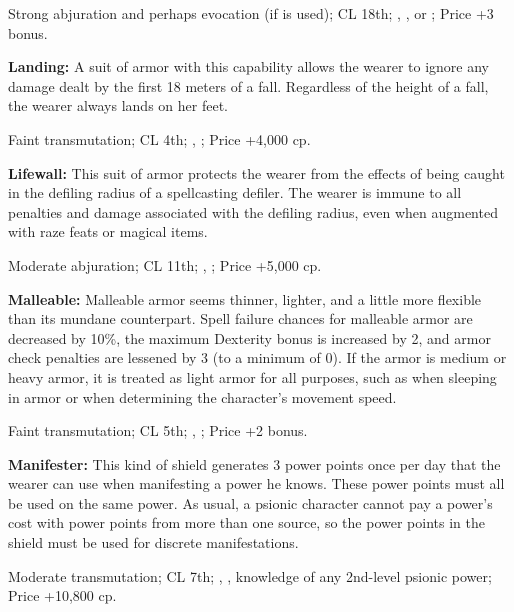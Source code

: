 Strong abjuration and perhaps evocation (if  is used); CL 18th; , ,  or ; Price +3 bonus.

\textbf{Landing:} A suit of armor with this capability allows the wearer to ignore any damage dealt by the first 18 meters of a fall. Regardless of the height of a fall, the wearer always lands on her feet.

Faint transmutation; CL 4th; , ; Price +4,000 cp.

\textbf{Lifewall:} This suit of armor protects the wearer from the effects of being caught in the defiling radius of a spellcasting defiler. The wearer is immune to all penalties and damage associated with the defiling radius, even when augmented with raze feats or magical items.

Moderate abjuration; CL 11th; , ; Price +5,000 cp.



\textbf{Malleable:} Malleable armor seems thinner, lighter, and a little more flexible than its mundane counterpart. Spell failure chances for malleable armor are decreased by 10\%, the maximum Dexterity bonus is increased by 2, and armor check penalties are lessened by 3 (to a minimum of 0). If the armor is medium or heavy armor, it is treated as light armor for all purposes, such as when sleeping in armor or when determining the character's movement speed.

Faint transmutation; CL 5th; , ; Price +2 bonus.

\textbf{Manifester:} This kind of shield generates 3 power points once per day that the wearer can use when manifesting a power he knows. These power points must all be used on the same power. As usual, a psionic character cannot pay a power's cost with power points from more than one source, so the power points in the shield must be used for discrete manifestations.

Moderate transmutation; CL 7th; , , knowledge of any 2nd-level psionic power; Price +10,800 cp.

